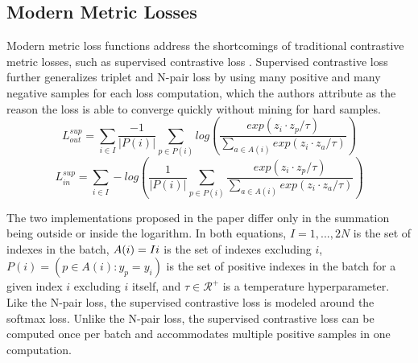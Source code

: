\documentclass[./dissertation.tex]{subfiles}
\begin{document}
    \subsection{Modern Metric Losses}
    Modern metric loss functions address the shortcomings of traditional contrastive metric losses, such as supervised contrastive loss \cite{khosla2020supervised}. Supervised contrastive loss further generalizes triplet and N-pair loss by using many positive and many negative samples for each loss computation, which the authors attribute as the reason the loss is able to converge quickly without mining for hard samples. \\ 
    
    \begin{equation*}
    L_{out}^{sup} = \sum_{i \in I} \frac{-1}{|P(i)|}
    \sum_{p \in P(i)}log(\frac{exp(z_{i} \cdot z_{p} / \tau)}
    {\sum_{a \in A(i)}exp(z_{i} \cdot z_{a} / \tau)}) 
    \end{equation*} 
    \begin{equation*}
    L_{in}^{sup} = \sum_{i \in I} -log(\frac{1}{|P(i)|}\sum_{p \in P(i)}
    \frac{exp(z_{i} \cdot z_{p} / \tau)}
    {\sum_{a \in A(i)}exp(z_{i} \cdot z_{a} / \tau)}) 
    \end{equation*}
    
    The two implementations proposed in the paper differ only in the summation being outside or inside the logarithm. In both equations, $I = {1, ..., 2N}$ is the set of indexes in the batch, $A(i) = I \\ i$ is the set of indexes excluding $i$, $P(i) = (p \in A(i) : y_{p} = y _{i})$ is the set of positive indexes in the batch for a given index $i$ excluding $i$ itself, and $\tau \in \mathcal{R}^{+}$ is a temperature hyperparameter. Like the N-pair loss, the supervised contrastive loss is modeled around the softmax loss. Unlike the N-pair loss, the supervised contrastive loss can be computed once per batch and accommodates multiple positive samples in one computation. \\
    
\end{document}
